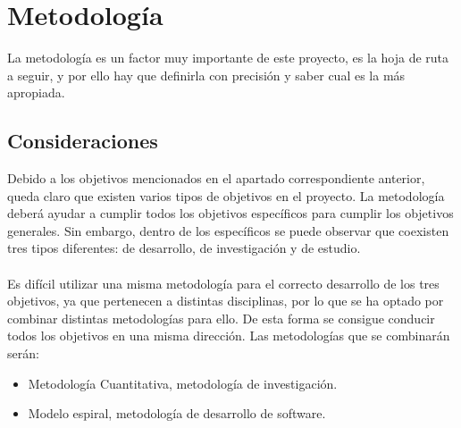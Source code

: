 \chapter{Metodología}
\thispagestyle{fancy}

La metodología es un factor muy importante de este proyecto, es la hoja de ruta a seguir, y por ello hay que definirla con precisión y saber cual es la más apropiada.

\section{Consideraciones}
Debido a los objetivos mencionados en el apartado correspondiente anterior, queda claro que existen varios tipos de objetivos en el proyecto. La metodología deberá ayudar a cumplir todos los objetivos específicos para cumplir los objetivos generales. Sin embargo, dentro de los específicos se puede observar que coexisten tres tipos diferentes: de desarrollo, de investigación y de estudio.
\\ \\
Es difícil utilizar una misma metodología para el correcto desarrollo de los tres objetivos, ya que pertenecen a distintas disciplinas, por lo que se ha optado por combinar distintas metodologías para ello. De esta forma se consigue conducir todos los objetivos en una misma dirección. Las metodologías que se combinarán serán:
\begin{itemize}
    \item Metodología Cuantitativa, metodología de investigación.
    \item Modelo espiral, metodología de desarrollo de software.
\end{itemize}


